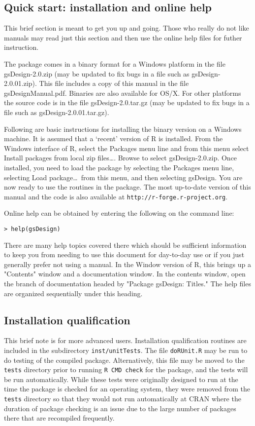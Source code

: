 \subsection{Quick start: installation and online help\label{sec:quickstart}}
This brief section is meant to get you up and going. Those who really do not like manuals may read just this section and then use the online help files for futher instruction.

The package comes in a binary format for a Windows platform in the file
gsDesign-2.0.zip (may be updated to fix bugs in a file such as
gsDesign-2.0.01.zip). This file includes a copy of this manual in the file
gsDesignManual.pdf. 
Binaries are also available for OS/X. For other platforms the source code is in the file gsDesign-2.0.tar.gz (may be updated to fix bugs in
a file such as gsDesign-2.0.01.tar.gz). 

Following are basic instructions for
installing the binary version on a Windows machine. It is assumed that a
`recent' version of R is installed. From the Windows interface of R, select
the Packages menu line and from this menu select Install packages from local
zip files\ldots. Browse to select gsDesign-2.0.zip. Once installed, you need
to load the package by selecting the Packages menu line, selecting Load
package\ldots\ from this menu, and then selecting gsDesign. You are now ready
to use the routines in the package. The most up-to-date version of this manual
and the code is also available at \texttt{http://r-forge.r-project.org}.

\bigskip

Online help can be obtained by entering the following on the command line:

\bigskip
\begin{verbatim}
> help(gsDesign)
\end{verbatim}
\bigskip

There are many help topics covered there which should be sufficient
information to keep you from needing to use this document for day-to-day use or if you just generally prefer not using a manual.
In the Window version of R, this brings up a "Contents" window and a
documentation window. In the contents window, open the branch of documentation
headed by "Package gsDesign: Titles." The help files are organized
sequentially under this heading. 

\subsection{Installation qualification}
This brief note is for more advanced users. Installation qualification routines are included in the subdirectory {\tt inst/unitTests}. The file {\tt doRUnit.R} may be run to do testing of the compiled package. 
Alternatively, this file may be moved to the {\tt tests} directory prior to running {\tt R CMD check} for the package, and the tests will be run automatically.
While these tests were originally designed to run at the time the package is checked for an operating system, they were removed from the {\tt tests} directory so that they would not run automatically at CRAN where the duration of package checking is an issue due to the large number of packages there that are recompiled frequently. 


